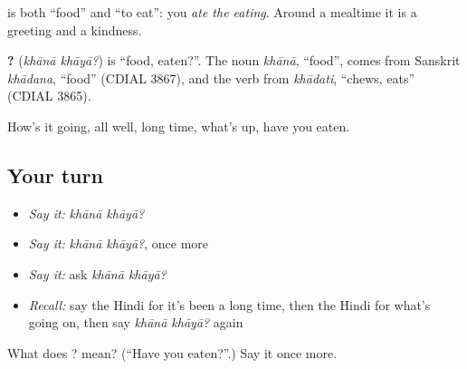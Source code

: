 \textbf{} is both \textquotedblleft{}food\textquotedblright{} and \textquotedblleft{}to eat\textquotedblright{}: you \emph{ate the eating}. Around a mealtime it is a greeting and a kindness.

\begin{cousinweb}
\textbf{ ?} (\emph{khānā khāyā?}) is \textquotedblleft{}food, eaten?\textquotedblright{}. The noun \emph{khānā}, \textquotedblleft{}food\textquotedblright{}, comes from Sanskrit \emph{khādana}, \textquotedblleft{}food\textquotedblright{} (CDIAL 3867), and the verb from \emph{khādati}, \textquotedblleft{}chews, eats\textquotedblright{} (CDIAL 3865).
\end{cousinweb}

\begin{grammarlens}[title={What you've built}]
How's it going, all well, long time, what's up, have you eaten.
\end{grammarlens}

\subsection*{Your turn}
\begin{itemize}
\raggedright
  \item \emph{Say it:} \emph{khānā khāyā?}
  \item \emph{Say it:} \emph{khānā khāyā?}, once more
  \item \emph{Say it:} ask \emph{khānā khāyā?}
  \item \emph{Recall:} say the Hindi for it's been a long time, then the Hindi for what's going on, then say \emph{khānā khāyā?} again
\end{itemize}

\begin{tcolorbox}[breakable,colback=teal!4,colframe=teal!35!black,title={Before you move on}]
What does  ? mean? (\textquotedblleft{}Have you eaten?\textquotedblright{}.) Say it once more.
\end{tcolorbox}
